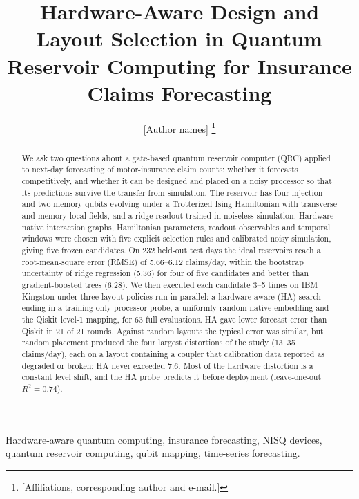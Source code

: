\documentclass[journal]{IEEEtran}
\begin{document}
\title{Hardware-Aware Design and Layout Selection in Quantum Reservoir Computing for Insurance Claims Forecasting}

\author{[Author names]%
\thanks{[Affiliations, corresponding author and e-mail.]}}


\maketitle

\begin{abstract}
We ask two questions about a gate-based quantum reservoir computer (QRC) applied to next-day forecasting of motor-insurance claim counts: whether it forecasts competitively, and whether it can be designed and placed on a noisy processor so that its predictions survive the transfer from simulation. The reservoir has four injection and two memory qubits evolving under a Trotterized Ising Hamiltonian with transverse and memory-local fields, and a ridge readout trained in noiseless simulation. Hardware-native interaction graphs, Hamiltonian parameters, readout observables and temporal windows were chosen with five explicit selection rules and calibrated noisy simulation, giving five frozen candidates. On 232 held-out test days the ideal reservoirs reach a root-mean-square error (RMSE) of 5.66--6.12 claims/day, within the bootstrap uncertainty of ridge regression (5.36) for four of five candidates and better than gradient-boosted trees (6.28). We then executed each candidate 3--5 times on IBM Kingston under three layout policies run in parallel: a hardware-aware (HA) search ending in a training-only processor probe, a uniformly random native embedding and the Qiskit level-1 mapping, for 63 full evaluations. HA gave lower forecast error than Qiskit in 21 of 21 rounds. Against random layouts the typical error was similar, but random placement produced the four largest distortions of the study (13--35 claims/day), each on a layout containing a coupler that calibration data reported as degraded or broken; HA never exceeded 7.6. Most of the hardware distortion is a constant level shift, and the HA probe predicts it before deployment (leave-one-out $R^2=0.74$).
\end{abstract}

\begin{IEEEkeywords}
Hardware-aware quantum computing, insurance forecasting, NISQ devices, quantum reservoir computing, qubit mapping, time-series forecasting.
\end{IEEEkeywords}
\end{document}

